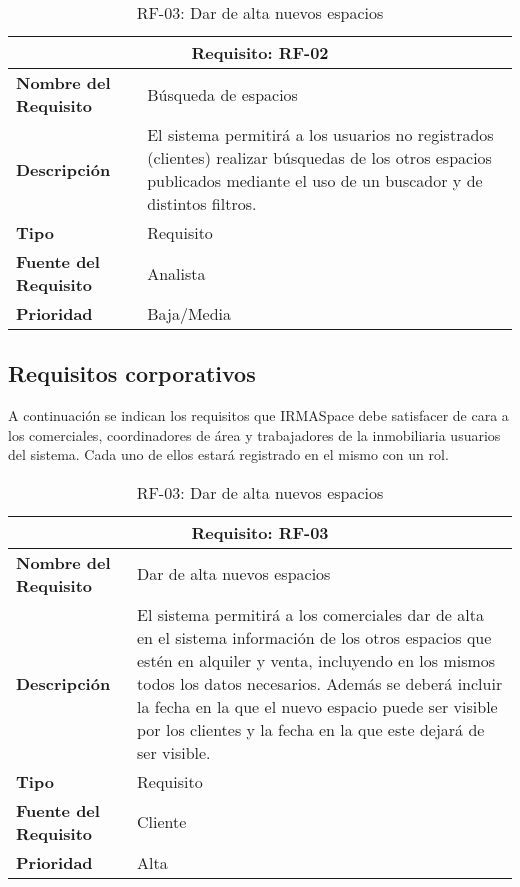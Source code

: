 \begin{table}[H]
\begin{center}
\begin{tabular}{p{} p{7cm}}
\multicolumn{2}{c}{\textbf{Requisito: RF-02} } \\
\hline \hline
\textbf{Nombre del Requisito} &  Búsqueda de espacios \\
\hline
\textbf{Descripción} & El sistema permitirá a los usuarios no registrados (clientes) realizar búsquedas de los otros espacios publicados mediante el uso de un buscador y de distintos filtros. \\
\hline
\textbf{Tipo} & Requisito  \\
\hline
\textbf{Fuente del Requisito} &  Analista \\
\hline
\textbf{Prioridad} &  Baja/Media \\ \hline
\end{tabular}
\caption{RF-02: Búsqueda de espacios}
\label{tab:RF-02}
\end{center}

\subsection{Requisitos corporativos}

\par A continuación se indican los requisitos que IRMASpace debe satisfacer de cara a los comerciales, coordinadores de área y trabajadores de la inmobiliaria usuarios del sistema. Cada uno de ellos estará registrado en el mismo con un rol.

\begin{table}[H]
\begin{center}
\begin{tabular}{p{} p{7cm}}
\multicolumn{2}{c}{\textbf{Requisito: RF-03} } \\
\hline \hline
\textbf{Nombre del Requisito} & Dar de alta nuevos espacios  \\
\hline
\textbf{Descripción} & El sistema permitirá a los comerciales dar de alta en el sistema información de los otros espacios que estén en alquiler y venta, incluyendo en los mismos todos los datos necesarios. Además se deberá incluir la fecha en la que el nuevo espacio puede ser visible por los clientes y la fecha en la que este dejará de ser visible.\\
\hline
\textbf{Tipo} & Requisito  \\
\hline
\textbf{Fuente del Requisito} & Cliente \\
\hline
\textbf{Prioridad} &  Alta \\ \hline
\end{tabular}
\caption{RF-03: Dar de alta nuevos espacios}
\label{tab:RF-03}
\end{center}
\end{table}


\end{table}

